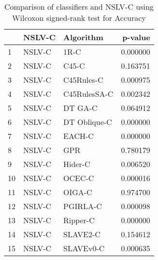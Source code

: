\begin{table}
\footnotesize
\caption{Comparison of classifiers and NSLV-C using Wilcoxon signed-rank test for Accuracy}
\label{tab:NSLV-C wilcoxon Accuracy comparison}
\begin{tabular}{lllr}
\hline
 & NSLV-C & Algorithm & p-value \\
\hline
1 & NSLV-C & 1R-C & 0.000000 \\
2 & NSLV-C & C45-C & 0.163751 \\
3 & NSLV-C & C45Rules-C & 0.000975 \\
4 & NSLV-C & C45RulesSA-C & 0.002342 \\
5 & NSLV-C & DT GA-C & 0.064912 \\
6 & NSLV-C & DT Oblique-C & 0.000000 \\
7 & NSLV-C & EACH-C & 0.000000 \\
8 & NSLV-C & GPR & 0.780179 \\
9 & NSLV-C & Hider-C & 0.006520 \\
10 & NSLV-C & OCEC-C & 0.000016 \\
11 & NSLV-C & OIGA-C & 0.974700 \\
12 & NSLV-C & PGIRLA-C & 0.000098 \\
13 & NSLV-C & Ripper-C & 0.000000 \\
14 & NSLV-C & SLAVE2-C & 0.154612 \\
15 & NSLV-C & SLAVEv0-C & 0.000635 \\
\hline
\end{tabular}
\end{table}
